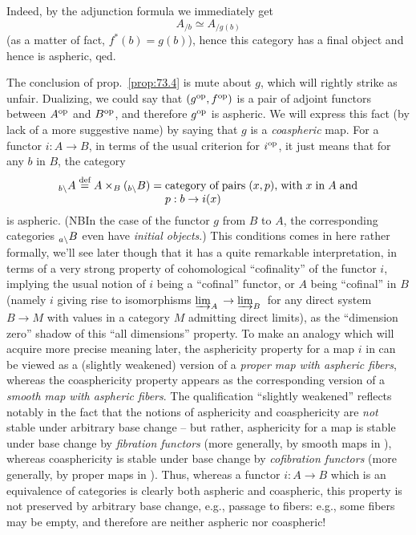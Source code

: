 Indeed, by the adjunction formula we immediately get
\[A_{/b} \simeq A_{/g(b)}\]
(as a matter of fact, $f^*(b)=g(b)$), hence this category has a final
object and hence is aspheric, qed.

\addtocounter{remarknum}{4}
\begin{remarknum}
  The conclusion of prop.\ \ref{prop:73.4} is mute about $g$, which
  will rightly strike as unfair. Dualizing, we could say that
  $(g^{\mathrm{op}},f^{\mathrm{op}})$ is a pair of adjoint functors between $A^{\mathrm{op}}$ and
  $B^{\mathrm{op}}$, and therefore $g^{\mathrm{op}}$ is aspheric. We will express this fact
  (by lack of a more suggestive name) by saying that $g$ is a
  \emph{coaspheric} map. For a functor $i:A\to B$, in terms of the
  usual criterion for $i^{\mathrm{op}}$, it just means that for any
  $b$ in $B$, the category
  \[\preslice Ab \eqdef A \times_B(\preslice Bb)
  = \parbox[t]{0.5\textwidth}{category of pairs $(x,p)$, with $x$ in
    $A$ and $p:b\to i(x)$}\]
  is aspheric. (NB\enspace In the case of the functor $g$ from $B$ to
  $A$, the corresponding categories $\preslice Ba$ even have
  \emph{initial objects}.) This conditions comes in here rather
  formally, we'll see later though that it has a quite remarkable
  interpretation, in terms of a very strong property of cohomological
  ``cofinality'' of the functor $i$, implying the usual notion of $i$
  being a ``cofinal'' functor, or $A$ being ``cofinal'' in $B$ (namely
  $i$ giving rise to isomorphisms $\varinjlim_A{} \to \varinjlim_B{}$
  for any direct system $B\to M$ with values in a category $M$
  admitting direct limits), as the ``dimension zero'' shadow of this
  ``all dimensions'' property. To make an analogy which will acquire
  more precise meaning later, the asphericity property for a map $i$
  in \Cat{} can be viewed as a (slightly weakened) version of a
  \emph{proper map with aspheric fibers}, whereas the coasphericity
  property appears as the corresponding version of a \emph{smooth map
    with aspheric fibers}. The qualification ``slightly weakened''
  reflects notably in the fact that the notions of asphericity and
  coasphericity are \emph{not} stable under arbitrary base change --
  but rather, asphericity for a map is stable under base change by
  \emph{fibration functors} (more generally, by smooth maps in \Cat),
  whereas coasphericity is stable under base change by
  \emph{cofibration functors} (more generally, by proper maps in
  \Cat). Thus, whereas a functor $i:A\to B$ which is an equivalence of
  categories is clearly both aspheric and coaspheric, this property is
  not preserved by arbitrary base change, e.g., passage to fibers:
  e.g., some fibers may be empty, and therefore are neither aspheric
  nor coaspheric!
\end{remarknum}

